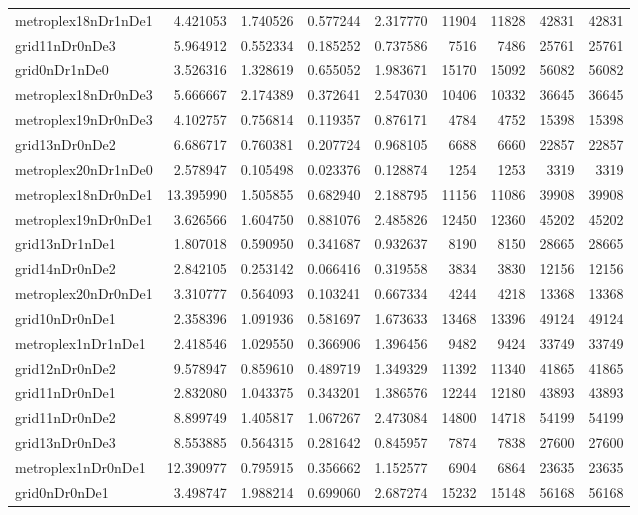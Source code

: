 \begin{longtable}{|l|r|r|r|r|r|r|r|r|}
metroplex18nDr1nDe1 & 4.421053 & 1.740526 & 0.577244 & 2.317770 & 11904 & 11828 & 42831 & 42831 \\
grid11nDr0nDe3 & 5.964912 & 0.552334 & 0.185252 & 0.737586 & 7516 & 7486 & 25761 & 25761 \\
grid0nDr1nDe0 & 3.526316 & 1.328619 & 0.655052 & 1.983671 & 15170 & 15092 & 56082 & 56082 \\
metroplex18nDr0nDe3 & 5.666667 & 2.174389 & 0.372641 & 2.547030 & 10406 & 10332 & 36645 & 36645 \\
metroplex19nDr0nDe3 & 4.102757 & 0.756814 & 0.119357 & 0.876171 & 4784 & 4752 & 15398 & 15398 \\
grid13nDr0nDe2 & 6.686717 & 0.760381 & 0.207724 & 0.968105 & 6688 & 6660 & 22857 & 22857 \\
metroplex20nDr1nDe0 & 2.578947 & 0.105498 & 0.023376 & 0.128874 & 1254 & 1253 & 3319 & 3319 \\
metroplex18nDr0nDe1 & 13.395990 & 1.505855 & 0.682940 & 2.188795 & 11156 & 11086 & 39908 & 39908 \\
metroplex19nDr0nDe1 & 3.626566 & 1.604750 & 0.881076 & 2.485826 & 12450 & 12360 & 45202 & 45202 \\
grid13nDr1nDe1 & 1.807018 & 0.590950 & 0.341687 & 0.932637 & 8190 & 8150 & 28665 & 28665 \\
grid14nDr0nDe2 & 2.842105 & 0.253142 & 0.066416 & 0.319558 & 3834 & 3830 & 12156 & 12156 \\
metroplex20nDr0nDe1 & 3.310777 & 0.564093 & 0.103241 & 0.667334 & 4244 & 4218 & 13368 & 13368 \\
grid10nDr0nDe1 & 2.358396 & 1.091936 & 0.581697 & 1.673633 & 13468 & 13396 & 49124 & 49124 \\
metroplex1nDr1nDe1 & 2.418546 & 1.029550 & 0.366906 & 1.396456 & 9482 & 9424 & 33749 & 33749 \\
grid12nDr0nDe2 & 9.578947 & 0.859610 & 0.489719 & 1.349329 & 11392 & 11340 & 41865 & 41865 \\
grid11nDr0nDe1 & 2.832080 & 1.043375 & 0.343201 & 1.386576 & 12244 & 12180 & 43893 & 43893 \\
grid11nDr0nDe2 & 8.899749 & 1.405817 & 1.067267 & 2.473084 & 14800 & 14718 & 54199 & 54199 \\
grid13nDr0nDe3 & 8.553885 & 0.564315 & 0.281642 & 0.845957 & 7874 & 7838 & 27600 & 27600 \\
metroplex1nDr0nDe1 & 12.390977 & 0.795915 & 0.356662 & 1.152577 & 6904 & 6864 & 23635 & 23635 \\
grid0nDr0nDe1 & 3.498747 & 1.988214 & 0.699060 & 2.687274 & 15232 & 15148 & 56168 & 56168 \\

\end{longtable}
